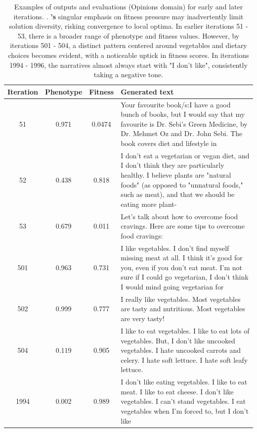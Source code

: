 \begin{table}[ht]
  \caption{Examples of outputs and evaluations (Opinions domain) for early and later iterations. \basefour. \basefour\textbf{'s} singular emphasis on fitness pressure may inadvertently limit solution diversity, risking convergence to local optima. In earlier iterations 51 - 53, there is a broader range of phenotype and fitness values. However, by iterations 501 - 504, a distinct pattern centered around vegetables and dietary choices becomes evident, with a noticeable uptick in fitness scores. In iterations 1994 - 1996, the narratives almost always start with "I don't like", consistently taking a negative tone.}
  \label{tab:b4-qualitative-opinion}
  \begin{center}
  \small
  \begin{tabular}{cccp{8.5cm}}
    \toprule
    Iteration     & Phenotype  & Fitness     & Generated text \\
    \midrule
    51 &  0.971 & 0.0474 & Your favourite book/s:I have a good bunch of books, but I would say that my favourite is Dr. Sebi's Green Medicine, by Dr. Mehmet Oz and Dr. John Sebi. The book covers diet and lifestyle in \\
    \midrule
    52 & 0.438 & 0.818 & I don't eat a vegetarian or vegan diet, and I don't think they are particularly healthy. I believe plants are "natural foods" (as opposed to "unnatural foods," such as meat), and that we should be eating more plant- \\
    \midrule
    53 & 0.679 & 0.011 & Let's talk about how to overcome food cravings. Here are some tips to overcome food cravings: \\
    \midrule
    \midrule
    501 &  0.963 & 0.731 & I like vegetables. I don't find myself missing meat at all. I think it's good for you, even if you don't eat meat. I'm not sure if I could go vegetarian, I don't think I would mind going vegetarian for \\
    \midrule
    502 & 0.999 & 0.777 & I really like vegetables. Most vegetables are tasty and nutritious. Most vegetables are very tasty! \\
    \midrule
    504 & 0.119 & 0.905 & I like to eat vegetables. I like to eat lots of vegetables. But, I don't like uncooked vegetables. I hate uncooked carrots and celery. I hate soft lettuce. I hate soft leafy lettuce. \\
    \midrule
    \midrule
    1994 &  0.002 & 0.989 & I don't like eating vegetables. I like to eat meat. I like to eat cheese. I don't like vegetables. I can't stand vegetables. I eat vegetables when I'm forced to, but I don't like \\

\end{tabular}
\end{center}
\end{table}
